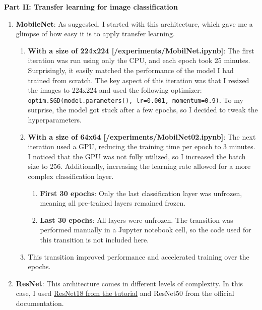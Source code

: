 \documentclass{cpsc202}
\begin{document}
    \large\textbf{Part II: Transfer learning for image classification}

    \begin{enumerate}
        \item \textbf{MobileNet}: As suggested, I started with this architecture, which gave me a glimpse of how easy it is to apply transfer learning.
        \begin{enumerate}
            \item \textbf{With a size of 224x224 [/experiments/MobilNet.ipynb]}: The first iteration was run using only the CPU, and each epoch took 25 minutes.
            Surprisingly, it easily matched the performance of the model I had trained from scratch.
            The key aspect of this iteration was that I resized the images to 224x224 and used the following optimizer:
            \lstinline|optim.SGD(model.parameters(), lr=0.001, momentum=0.9)|.
            To my surprise, the model got stuck after a few epochs, so I decided to tweak the hyperparameters.

            \item \textbf{With a size of 64x64 [/experiments/MobilNet02.ipynb]}: The next iteration used a GPU, reducing the training time per epoch to 3 minutes.
            I noticed that the GPU was not fully utilized, so I increased the batch size to 256.
            Additionally, increasing the learning rate allowed for a more complex classification layer.

            \begin{enumerate}
                \item \textbf{First 30 epochs}: Only the last classification layer was unfrozen, meaning all pre-trained layers remained frozen.
                \item \textbf{Last 30 epochs}: All layers were unfrozen.
                The transition was performed manually in a Jupyter notebook cell, so the code used for this transition is not included here.
            \end{enumerate}

            \item This transition improved performance and accelerated training over the epochs.
        \end{enumerate}

        \item \textbf{ResNet}: This architecture comes in different levels of complexity.
        In this case, I used \href{https://pytorch.org/tutorials/beginner/transfer_learning_tutorial.html}{ResNet18 from the tutorial} and ResNet50 from the official documentation.


\end{enumerate}
\end{document}
